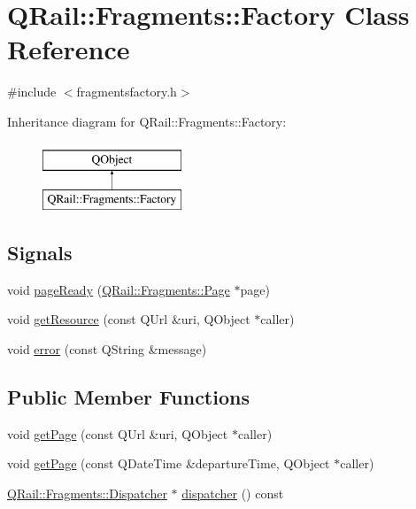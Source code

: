 \hypertarget{classQRail_1_1Fragments_1_1Factory}{}\section{Q\+Rail\+::Fragments\+::Factory Class Reference}
\label{classQRail_1_1Fragments_1_1Factory}


{\ttfamily \#include $<$fragmentsfactory.\+h$>$}

Inheritance diagram for Q\+Rail\+::Fragments\+::Factory\+:\begin{figure}[H]
\begin{center}
\leavevmode
\includegraphics[height=2.000000cm]{classQRail_1_1Fragments_1_1Factory}
\end{center}
\end{figure}
\subsection*{Signals}
\begin{DoxyCompactItemize}
\item 
void \mbox{\hyperlink{classQRail_1_1Fragments_1_1Factory_a1ba7147390ac01a41fd82412468d64fa}{page\+Ready}} (\mbox{\hyperlink{classQRail_1_1Fragments_1_1Page}{Q\+Rail\+::\+Fragments\+::\+Page}} $\ast$page)
\item 
void \mbox{\hyperlink{classQRail_1_1Fragments_1_1Factory_aea317c8efb3b0edfcd937935293b5988}{get\+Resource}} (const Q\+Url \&uri, Q\+Object $\ast$caller)
\item 
void \mbox{\hyperlink{classQRail_1_1Fragments_1_1Factory_a681785e7cb92638163ad326fbb3a0c84}{error}} (const Q\+String \&message)
\end{DoxyCompactItemize}
\subsection*{Public Member Functions}
\begin{DoxyCompactItemize}
\item 
void \mbox{\hyperlink{classQRail_1_1Fragments_1_1Factory_ae603b69714d209caee04f7024c39548b}{get\+Page}} (const Q\+Url \&uri, Q\+Object $\ast$caller)
\item 
void \mbox{\hyperlink{classQRail_1_1Fragments_1_1Factory_a9a1ad3f27d325db60b7221fe4124353a}{get\+Page}} (const Q\+Date\+Time \&departure\+Time, Q\+Object $\ast$caller)
\item 
\mbox{\hyperlink{classQRail_1_1Fragments_1_1Dispatcher}{Q\+Rail\+::\+Fragments\+::\+Dispatcher}} $\ast$ \mbox{\hyperlink{classQRail_1_1Fragments_1_1Factory_a32781d890e698f2daed981510c72287c}{dispatcher}} () const
\end{DoxyCompactItemize}
